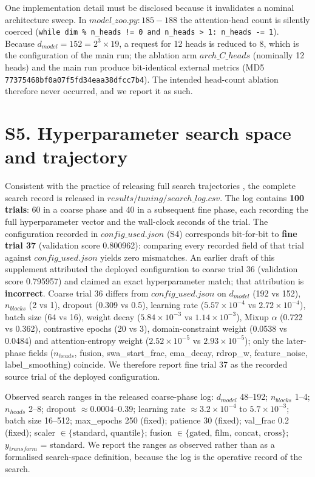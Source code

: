 \documentclass[utf8]{frontiers_suppmat}
\begin{document}
One implementation detail must be disclosed because it invalidates a nominal architecture sweep. In $model\_zoo.py{:}185{-}188$ the attention-head count is silently coerced (\texttt{while dim \% n\_heads != 0 and n\_heads > 1: n\_heads -= 1}). Because $d_{model} = 152 = 2^3 \times 19$, a request for 12 heads is reduced to 8, which is the configuration of the main run; the ablation arm $arch\_C\_heads$ (nominally 12 heads) and the main run produce bit-identical external metrics (MD5 \texttt{77375468bf0a07f5fd34eaa38dfcc7b4}). The intended head-count ablation therefore never occurred, and we report it as such.

\section{S5. Hyperparameter search space and trajectory}

Consistent with the practice of releasing full search trajectories \cite{grinsztajn2022}, the complete search record is released in $results/tuning/search\_log.csv$. The log contains \textbf{100 trials}: 60 in a coarse phase and 40 in a subsequent fine phase, each recording the full hyperparameter vector and the wall-clock seconds of the trial. The configuration recorded in $config\_used.json$ (S4) corresponds bit-for-bit to \textbf{fine trial 37} (validation score 0.800962): comparing every recorded field of that trial against $config\_used.json$ yields zero mismatches. An earlier draft of this supplement attributed the deployed configuration to coarse trial 36 (validation score 0.795957) and claimed an exact hyperparameter match; that attribution is \textbf{incorrect}. Coarse trial 36 differs from $config\_used.json$ on $d_{model}$ (192 vs 152), $n_{blocks}$ (2 vs 1), dropout (0.309 vs 0.5), learning rate ($5.57 \times 10^{-4}$ vs $2.72 \times 10^{-4}$), batch size (64 vs 16), weight decay ($5.84 \times 10^{-3}$ vs $1.14 \times 10^{-3}$), Mixup $\alpha$ (0.722 vs 0.362), contrastive epochs (20 vs 3), domain-constraint weight (0.0538 vs 0.0484) and attention-entropy weight ($2.52 \times 10^{-5}$ vs $2.93 \times 10^{-5}$); only the later-phase fields ($n_{heads}$, fusion, swa\_start\_frac, ema\_decay, rdrop\_w, feature\_noise, label\_smoothing) coincide. We therefore report fine trial 37 as the recorded source trial of the deployed configuration.

Observed search ranges in the released coarse-phase log: $d_{model}$ 48--192; $n_{blocks}$ 1--4; $n_{heads}$ 2--8; dropout $\approx$0.0004--0.39; learning rate $\approx 3.2 \times 10^{-4}$ to $5.7 \times 10^{-3}$; batch size 16--512; max\_epochs 250 (fixed); patience 30 (fixed); val\_frac 0.2 (fixed); scaler $\in \{\text{standard, quantile}\}$; fusion $\in \{\text{gated, film, concat, cross}\}$; $y_{transform}$ = standard. We report the ranges as observed rather than as a formalised search-space definition, because the log is the operative record of the search.
\end{document}
